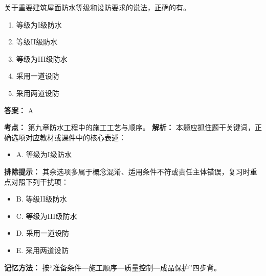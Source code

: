 \documentclass[UTF8,fontset=fandol,11pt]{ctexart}
\begin{document}
\begin{quizbox}[title={第 1 题}]
关于重要建筑屋面防水等级和设防要求的说法，正确的有。\\
\begin{enumerate}[label=\Alph*.]
\item 等级为I级防水
\item 等级II级防水
\item 等级为III级防水
\item 采用一道设防
\item 采用两道设防
\end{enumerate}
\textbf{答案：} A
\vspace{0.25em}
\begin{answerbox}[title={考点解析}]
\textbf{考点：} 第九章防水工程中的施工工艺与顺序。
\textbf{解析：} 本题应抓住题干关键词，正确选项对应教材或课件中的核心表述：
\begin{itemize}
\item A. 等级为I级防水
\end{itemize}
\textbf{排除提示：} 其余选项多属于概念混淆、适用条件不符或责任主体错误，复习时重点对照下列干扰项：
\begin{itemize}
\item B. 等级II级防水
\item C. 等级为III级防水
\item D. 采用一道设防
\item E. 采用两道设防
\end{itemize}
\textbf{记忆方法：} 按“准备条件—施工顺序—质量控制—成品保护”四步背。
\end{answerbox}
\end{quizbox}
\end{document}

